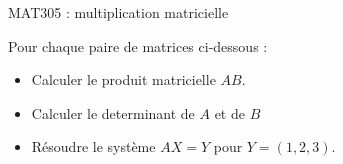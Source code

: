 \documentclass{article}
\begin{document}
\begin{center}
{\Large MAT305 : multiplication matricielle}\\
\end{center}

\vspace{.5in}
\hline
\vspace{.2in}
Pour chaque paire de matrices ci-dessous : 

\begin{itemize}
\item	Calculer le produit matricielle $AB$.
\item Calculer le determinant de $A$ et de $B$
\item Résoudre le système $AX= Y$
	pour $Y=(1,2,3)$.
\end{itemize}

\hline

\vspace{1in}
\end{document}

